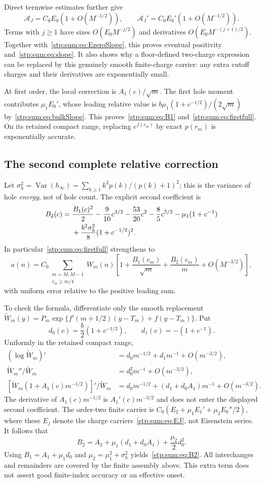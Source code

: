 \documentclass[11pt]{article}
\theoremstyle{remark}\newtheorem{remark}[theorem]{Remark}
\newcommand{\cA}{\mathcal A}
\DeclareMathOperator{\Var}{Var}
\begin{document}
Direct termwise estimates further give
\[
 \cA_J=C_0E_0(1+O(M^{-1/2})),\qquad
 \cA_J'=C_0E_0'(1+O(M^{-1/2})).
\]
Terms with $j\ge1$ have sizes $O(E_0M^{-j/2})$ and derivatives $O(E_0M^{-(j+1)/2})$. Together with~\eqref{stp:sum:eq:EzeroSlope}, this proves eventual positivity and~\eqref{stp:sum:eq:slope}. It also shows why a floor-defined two-charge expression can be replaced by this genuinely smooth finite-charge carrier: any extra cutoff charges and their derivatives are exponentially small.

At first order, the local correction is $A_1(c)/\sqrt m$. The first hole moment contributes $\mu_1E_0'$, whose leading relative value is $b\mu_1(1+c^{-1/2})/(2\sqrt m)$ by~\eqref{stp:sum:eq:bulkSlope}. This proves~\eqref{stp:sum:eq:B1} and~\eqref{stp:sum:eq:firstfull}. On its retained compact range, replacing $e^{f(r_m)}$ by exact $p(r_m)$ is exponentially accurate.

\subsection{The second complete relative correction}
\label{stp:sum:sub:B2}
Let $\sigma_h^2=\Var(h_\infty)=\sum_{k\ge1}k^2p(k)/(p(k)+1)^2$; this is the variance of hole \emph{energy}, not of hole count. The explicit second coefficient is
\begin{align}
 B_2(c)={}&\frac{B_1(c)^2}{2}-\frac9{10}c^{3/2}-\frac{53}{20}c^2
 -\frac85c^{5/2}-\mu_1(1+c^{-1})\notag\\
 &+\frac{b^2\sigma_h^2}{8}(1+c^{-1/2})^2.\label{stp:sum:eq:B2}
\end{align}
In particular~\eqref{stp:sum:eq:firstfull} strengthens to
\begin{equation}\label{stp:sum:eq:secondfull}
 a(n)=C_0\!\sum_{\substack{m=M,M-1\\r_m\ge m/4}}W_m(n)
 \left[1+\frac{B_1(c_m)}{\sqrt m}+\frac{B_2(c_m)}m+O(M^{-3/2})\right],
\end{equation}
with uniform error relative to the positive leading sum.

To check the formula, differentiate only the smooth replacement
$\widetilde W_m(y)=P_m\exp\{f'(m+1/2)(y-T_m)+f(y-T_m)\}$. Put
\[
 d_0(c)=\frac b2(1+c^{-1/2}),\qquad d_1(c)=-(1+c^{-1}).
\]
Uniformly in the retained compact range,
\begin{align*}
 (\log\widetilde W_m)'&=d_0m^{-1/2}+d_1m^{-1}+O(m^{-3/2}),\\
 \widetilde W_m''/\widetilde W_m&=d_0^2m^{-1}+O(m^{-3/2}),\\
 [\widetilde W_m(1+A_1(c)m^{-1/2})]'/\widetilde W_m
 &=d_0m^{-1/2}+(d_1+d_0A_1)m^{-1}+O(m^{-3/2}).
\end{align*}
The derivative of $A_1(c)m^{-1/2}$ is $A_1'(c)m^{-3/2}$ and does not enter the displayed second coefficient. The order-two finite carrier is
$C_0(E_2+\mu_1 E_1'+\mu_2E_0''/2)$, where these $E_j$ denote the charge carriers~\eqref{stp:sum:eq:EJ}, not Eisenstein series. It follows that
\[
 B_2=A_2+\mu_1(d_1+d_0A_1)+\frac{\mu_2}2d_0^2.
\]
Using $B_1=A_1+\mu_1d_0$ and $\mu_2=\mu_1^2+\sigma_h^2$ yields~\eqref{stp:sum:eq:B2}. All interchanges and remainders are covered by the finite assembly above. This extra term does not assert good finite-index accuracy or an effective onset.
\end{document}
